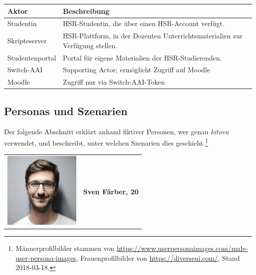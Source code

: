 \documentclass[a4paper]{article}
\begin{document}
\begin{tabulary}{\linewidth}{lL}
	\toprule
	Aktor & Beschreibung\\
	\midrule
	Studentin & HSR-Studentin, die über einen HSR-Account verfügt.\\
	Skripteserver & HSR-Plattform, in der Dozenten Unterrichtsmaterialien zur Verfügung stellen.\\
	Studentenportal & Portal für eigene Materialien der HSR-Studierenden.\\
	Switch-AAI & Supporting Actor; ermöglicht Zugriff auf Moodle \\	
	Moodle & Zugriff nur via Switch-AAI-Token\\
	
	\bottomrule
\end{tabulary}

\subsection{Personas und Szenarien}

Der folgende Abschnitt erklärt anhand fiktiver Personen, wer genau \emph{kitovu} verwendet, und beschreibt, unter welchen Szenarien dies geschieht.\footnote{Männerprofilbilder stammen von \url{https://www.userpersonaimages.com/male-user-persona-images}, Frauenprofilbilder von \url{https://diverseui.com/}, Stand 2018-03-18. }


\begin{tabulary}{\linewidth}{m{10em}l}
		\includegraphics[width=10em]{../../img/userpersonaimages01.png} & \textbf{{\large Sven Färber, 20}} \\
\end{tabulary}
\end{document}
